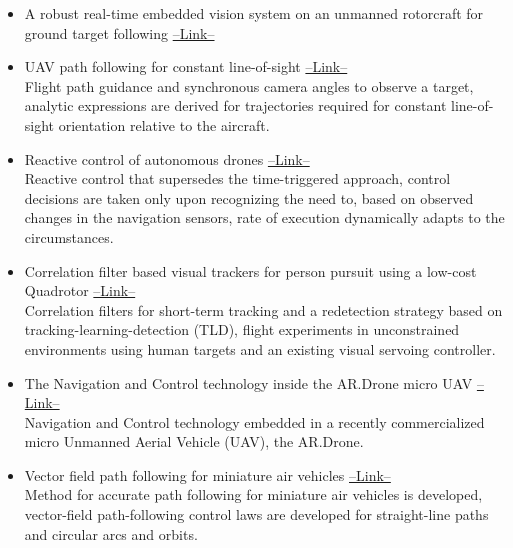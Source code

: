 \begin{enumerate}
\begin{itemize}
\item A robust real-time embedded vision system on an unmanned rotorcraft for ground target following \href{https://www.scopus.com/record/display.uri?eid=2-s2.0-80054803865&origin=reflist}{--Link--} \\

\item UAV path following for constant line-of-sight \href{https://www.scopus.com/record/display.uri?eid=2-s2.0-85088181184&origin=reflist}{--Link--} \\ 
Flight path guidance and synchronous camera angles to observe a target, analytic expressions are derived for trajectories required for constant line-of-sight orientation relative to the aircraft.

\item Reactive control of autonomous drones \href{https://www.scopus.com/record/display.uri?eid=2-s2.0-84979920485&origin=reflist}{--Link--} \\ 
Reactive control that supersedes the time-triggered approach, control decisions are taken only upon recognizing the need to, based on observed changes in the navigation sensors, rate of execution dynamically adapts to the circumstances.

\item Correlation filter based visual trackers for person pursuit using a low-cost Quadrotor \href{https://www.scopus.com/record/display.uri?eid=2-s2.0-84954554999&origin=reflist}{--Link--} \\ 
Correlation filters for short-term tracking and a redetection strategy based on tracking-learning-detection (TLD), flight experiments in unconstrained environments using human targets and an existing visual servoing controller.

\item The Navigation and Control technology inside the AR.Drone micro UAV \href{https://www.scopus.com/record/display.uri?eid=2-s2.0-84863704626&origin=reflist}{--Link--} \\ 
Navigation and Control technology embedded in a recently commercialized micro Unmanned Aerial Vehicle (UAV), the AR.Drone.

\item Vector field path following for miniature air vehicles \href{https://www.scopus.com/record/display.uri?eid=2-s2.0-34447327237&origin=reflist}{--Link--} \\ 
Method for accurate path following for miniature air vehicles is developed, vector-field path-following control laws are developed for straight-line paths and circular arcs and orbits.


\end{itemize}
\end{enumerate}
